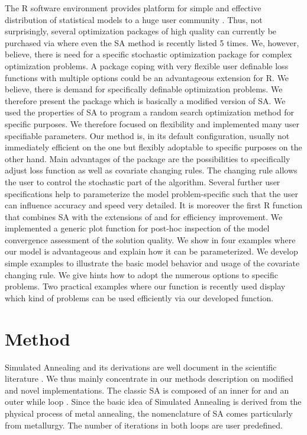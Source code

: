 The R software environment provides platform for simple and effective distribution of statistical models to a huge user community \citep{xiang_2013}. Thus, not surprisingly, several optimization packages of high quality can currently be purchased via  \citep{theussl_2016} where even the SA method is recently listed 5 times. We, however, believe, there is need for a specific stochastic optimization package for complex optimization problems. A package coping with very flexible user definable loss functions with multiple options could be an advantageous extension for R. We believe, there is demand for specifically definable optimization problems. We therefore present the package  which is basically a modified version of SA. We used the properties of SA to program a random search optimization method for specific purposes. We therefore focused on flexibility and implemented many user specifiable parameters. Our method is, in its default configuration, usually not immediately efficient on the one but flexibly adoptable to specific purposes on the other hand. Main advantages of the package are the possibilities to specifically adjust loss function as well as covariate changing rules. The changing rule allows the user to control the stochastic part of the algorithm. Several further user specifications help to parameterize the model problem-specific such that the user can influence accuracy and speed very detailed. It is moreover the first R function that combines SA with the extensions of \citet{corana_1987} and \citet{pronzato_1984} for efficiency improvement. We implemented a generic plot function for post-hoc inspection of the model convergence assessment of the solution quality. We show in four examples where our model is advantageous and explain how it can be parameterized. We develop simple examples to illustrate the basic model behavior and usage of the covariate changing rule. We give hints how to adopt the numerous options to specific problems. Two practical examples where our function is recently used display which kind of problems can be used efficiently via our developed function.

\section{Method}
Simulated Annealing and its derivations are well document in the scientific literature \citep[e. g. in][]{hansen_2012, kirkpatrick_1983, xiang_2013}. We thus mainly concentrate in our methods description on modified and novel implementations. The classic SA is composed of an inner for and an outer while loop \citep{kirkpatrick_1983}. Since the basic idea of Simulated Annealing is derived from the physical process of metal annealing, the nomenclature of SA comes particularly from metallurgy. The number of iterations in both loops are user predefined.

